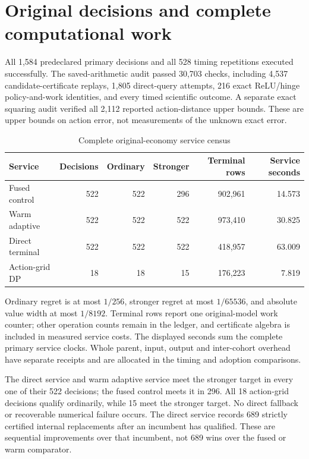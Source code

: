 \section{Original decisions and complete computational work}\label{sec:results126}

All 1,584 predeclared primary decisions and all 528 timing repetitions executed successfully. The saved-arithmetic audit passed 30,703 checks, including 4,537 candidate-certificate replays, 1,805 direct-query attempts, 216 exact ReLU/hinge policy-and-work identities, and every timed scientific outcome. A separate exact squaring audit verified all 2,112 reported action-distance upper bounds. These are upper bounds on action error, not measurements of the unknown exact error.

\begin{table}[t]\caption{Complete original-economy service census}\label{tab:service126}\centering

\begin{tabular}{lrrrrr}\toprule

Service & Decisions & Ordinary & Stronger & Terminal rows & Service seconds\\\midrule

Fused control & 522 & 522 & 296 & 902,961 & 14.573 \\

Warm adaptive & 522 & 522 & 522 & 973,410 & 30.825 \\

Direct terminal & 522 & 522 & 522 & 418,957 & 63.009 \\

Action-grid DP & 18 & 18 & 15 & 176,223 & 7.819 \\

\bottomrule\end{tabular}

\par\smallskip\footnotesize Ordinary regret is at most $1/256$, stronger regret at most $1/65536$, and absolute value width at most $1/8192$. Terminal rows report one original-model work counter; other operation counts remain in the ledger, and certificate algebra is included in measured service costs. The displayed seconds sum the complete primary service clocks. Whole parent, input, output and inter-cohort overhead have separate receipts and are allocated in the timing and adoption comparisons.

\end{table}

The direct service and warm adaptive service meet the stronger target in every one of their 522 decisions; the fused control meets it in 296. All 18 action-grid decisions qualify ordinarily, while 15 meet the stronger target. No direct fallback or recoverable numerical failure occurs. The direct service records 689 strictly certified internal replacements after an incumbent has qualified. These are sequential improvements over that incumbent, not 689 wins over the fused or warm comparator.

